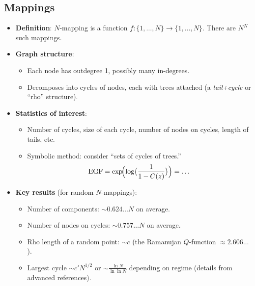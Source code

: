 \documentclass[11pt,letterpaper]{article}
\begin{document}
\subsection{Mappings}
\begin{itemize}
  \item \textbf{Definition}: $N$-mapping is a function $f: \{1,\dots,N\}\to\{1,\dots,N\}$. There are $N^N$ such mappings.
  \item \textbf{Graph structure}:
    \begin{itemize}
      \item Each node has outdegree 1, possibly many in-degrees.
      \item Decomposes into cycles of nodes, each with trees attached (a \emph{tail+cycle} or ``rho'' structure).
    \end{itemize}
  \item \textbf{Statistics of interest}:
    \begin{itemize}
      \item Number of cycles, size of each cycle, number of nodes on cycles, length of tails, etc.
      \item Symbolic method: consider ``sets of cycles of trees.'' 
      \[
        \text{EGF} = \exp\!\Bigl(\log\bigl(\frac{1}{1-C(z)}\bigr)\Bigr) = \dots
      \]
    \end{itemize}
  \item \textbf{Key results} (for random $N$-mappings):
    \begin{itemize}
      \item Number of components: $\sim 0.624\dots N$ on average.
      \item Number of nodes on cycles: $\sim 0.757\dots N$ on average.
      \item Rho length of a random point: $\sim c$ (the Ramanujan $Q$-function $\approx 2.606\dots$).
      \item Largest cycle $\sim c' N^{1/2}$ or $\sim \frac{\ln N}{\ln\ln N}$ depending on regime (details from advanced references).
    \end{itemize}
\end{itemize}

\end{document}
